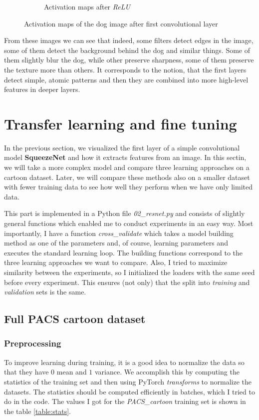 \documentclass[a4paper,11pt]{article}
\begin{document}
\begin{figure}[ht]
\begin{subfigure}[b]{0.4\textwidth}
        \caption{Activation maps after \textit{ReLU}}
    \end{subfigure}
    \hfill
    \caption{Activation maps of the dog image after first convolutional layer}
    \label{fig:activation-maps}
\end{figure}

From these images we can see that indeed, some filters detect edges in the image, some of them detect the background behind the dog and similar things.
Some of them slightly blur the dog, while other preserve sharpness, some of them preserve the texture more than others.
It corresponds to the notion, that the first layers detect simple, atomic patterns and then they are combined into more high-level features in deeper layers.

\section{Transfer learning and fine tuning}
In the previous section, we visualized the first layer of a simple convolutional model \textbf{SqueezeNet} and how it extracts features from an image.
In this sectin, we will take a more complex model and compare three learning approaches on a cartoon dataset.
Later, we will compare these methods also on a smaller dataset with fewer training data to see how well they perform when we have only limited data.

This part is implemented in a Python file \textit{02\_resnet.py} and consists of slightly general functions which enabled me to conduct experiments in an easy way.
Most importantly, I have a function \textit{cross\_validate} which takes a model building method as one of the parameters and, of course, learning parameters and executes the standard learning loop.
The building functions correspond to the three learning approaches we want to compare.
Also, I tried to maximize similarity between the experiments, so I initialized the loaders with the same seed before every experiment.
This ensures (not only) that the split into \textit{training} and \textit{validation} sets is the same.

\subsection{Full PACS cartoon dataset}

\subsubsection{Preprocessing}
To improve learning during training, it is a good idea to normalize the data so that they have $0$ mean and $1$ variance.
We accomplish this by computing the statistics of the training set and then using PyTorch \textit{transforms} to normalize the datasets.
The statistics should be computed efficiently in batches, which I tried to do in the code.
The values I got for the \textit{PACS\_cartoon} training set is shown in the table \ref{table:stats}.
\end{document}
